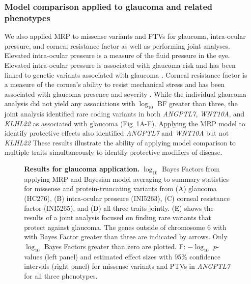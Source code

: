 \subsubsection*{Model comparison applied to glaucoma and related phenotypes}
We also applied MRP to missense variants and PTVs for glaucoma, intra-ocular pressure, and corneal resistance factor as well as performing joint analyses. Elevated intra-ocular pressure is a measure of the fluid pressure in the eye. Elevated intra-ocular pressure is associated with glaucoma risk and has been linked to genetic variants associated with glaucoma \cite{doi:10.1001/jama.2014.3192}. Corneal resistance factor is a measure of the cornea's ability to resist mechanical stress and has been associated with glaucoma presence and severity \cite{CXO:CXO414, MANSOURI2012419, GriseDulac:2012bo}. While the individual glaucoma analysis did not yield any associations with $\log_{10}$ BF greater than three, the joint analysis identified rare coding variants in both \textit{ANGPTL7}, \textit{WNT10A}, and \textit{KLHL22} as associated with glaucoma (Fig~\ref{glaucoma_bma}A-E). Applying the MRP model to identify protective effects also identified \textit{ANGPTL7} and \textit{WNT10A} but not \textit{KLHL22}
These results illustrate the ability of applying model comparison to multiple traits simultaneously to identify protective modifiers of disease. 

\begin{figure}[!h]
\caption{{\bf Results for glaucoma application.}
$\log_{10}$ Bayes Factors from applying MRP and Bayesian model averaging to summary statistics for missense and protein-truncating variants from (A) glaucoma (HC276), (B) intra-ocular pressure (INI5263), (C) corneal resistance factor (INI5265), and (D) all three traits jointly. (E) shows the results of a joint analysis focused on finding rare variants that protect against glaucoma. The genes outside of chromosome 6 with with Bayes Factor greater than three are indicated by arrows. Only $\log_{10}$ Bayes Factors greater than zero are plotted. F: $-\log_{10}$ $p$-values (left panel) and estimated effect sizes with 95\% confidence intervals (right panel) for missense variants and PTVs in \textit{ANGPTL7} for all three phenotypes.}
\label{glaucoma_bma}
\end{figure}

